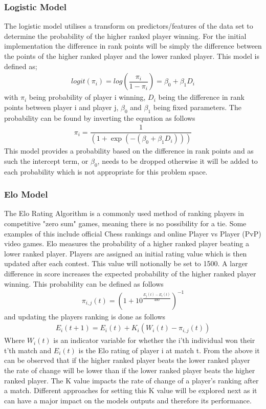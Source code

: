 \documentclass[12pt,a4paper]{article}
\begin{document}
\subsubsection{Logistic Model}
The logistic model utilises a transform on predictors/features of the data set to
determine the probability of the higher ranked player winning. For the initial
implementation the difference in rank points will be simply the difference
between the points of the higher ranked player and the lower ranked player. This
model is defined as;
\begin{gather}
  logit(\pi_i) = log(\dfrac{\pi_i}{1-\pi_i}) = \beta_0 + \beta_1 D_i
\end{gather}
with $\pi_i$ being probability of player i winning,
$D_i$ being the difference in rank points between player i and player j, $\beta_0$
and $\beta_1$ being fixed parameters. The probability can be found by inverting
the equation as follows
\begin{gather}
  \pi_i = \dfrac{1}{(1+\exp(-(\beta_0 + \beta_1 D_i)))}
\end{gather}
This model provides a probability based on the difference in rank points and as such the
intercept term, or $\beta_0$, needs to be dropped otherwise it will be added to each
probability which is not appropriate for this problem space.
\subsubsection{Elo Model}
The Elo Rating Algorithm is a commonly used method of ranking players in competitive "zero sum"
games, meaning there is no possibility for a tie. Some examples of this include official Chess rankings and online Player vs Player (PvP)
video games. Elo measures the probability of a higher ranked player beating a
lower ranked player. Players are assigned an initial rating value which is then updated after each contest.
This value will notionally be set to 1500. A larger difference in score increases the expected probability
of the higher ranked player winning. This probability can be defined as follows
\begin{gather}
  \pi_{i,j}(t) = (1 + 10^{\tfrac{E_j(t)-E_i(t)}{400}})^{-1}
\end{gather}
and updating the players ranking is done as follows
\begin{gather}
  E_i(t+1) = E_i(t) +K_i(W_i(t)-\pi_{i,j}(t))
\end{gather}
Where $W_i(t)$ is an indicator variable for whether the i'th individual won their
t'th match and $E_i(t)$ is the Elo rating of player i at match t.
From the above it can be observed that if the higher ranked player
beats the lower ranked player the rate of change will be lower than if the lower
ranked player beats the higher ranked player.
The K value impacts the rate of change of a player's ranking after a match. Different
approaches for setting this K value will be explored next as it can have a major
impact on the models outputs and therefore its performance.
\end{document}
